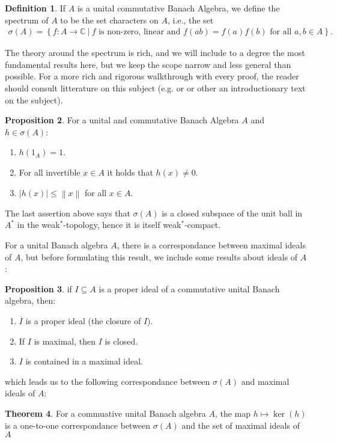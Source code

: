 \documentclass[10pt,twoside,openany,final]{memoir}
\theoremstyle{definition}
\newtheorem{theorem}{Theorem}[chapter]
\newtheorem{proposition}[theorem]{Proposition}
\newtheorem{definition}[theorem]{Definition}
\theoremstyle{Break}
\newcommand{\lv}{\left\lVert}
\newcommand{\rv}{\right\rVert}
\newcommand{\C}{\mathbb{C}}
\begin{document}
\begin{definition}
	If $A$ is a unital commutative Banach Algebra, we define the spectrum of $A$ to be the set characters on $A$, i.e., the set
	\begin{align*}
		\sigma(A)=\left\{ f \colon A \to \C \ \big| \ f \text{ is non-zero, linear and } f(ab)=f(a)f(b) \text{ for all } a,b \in A \right\}.
	\end{align*}
\end{definition}
The theory around the spectrum is rich, and we will include to a degree the most fundamental results here, but we keep the scope narrow and less general than possible. For a more rich and rigorous walkthrough with every proof, the reader should consult litterature on this subject (e.g. \cite{blackadar2006operator} or \cite{zhu1993introduction} or other an introductionary text on the subject).

\begin{proposition}
	For a unital and commutative Banach Algebra $A$ and $h \in \sigma(A)$:
	\begin{enumerate}
		\item $h(1_A)=1$.
		\item For all invertible $x \in A$ it holds that $h(x) \neq 0$.
		\item $|h(x)| \leq \lv x \rv$ for all $x \in A$.
	\end{enumerate}
\end{proposition}
The last assertion above says that $\sigma(A)$ is a closed subspace of the unit ball in $A^*$ in the weak$^*$-topology, hence it is itself weak$^*$-compact.

For a unital Banach algebra $A$, there is a correspondance between maximal ideals of $A$, but before formulating this result, we include some results about ideals of $A$:
\begin{proposition}
	if $I \subseteq A$ is a proper ideal of a commutative unital Banach algebra, then:
	\begin{enumerate}
		\item $\overline{I}$ is a proper ideal (the closure of $I$).
		\item If $I$ is maximal, then $I$ is closed.
		\item $I$ is contained in a maximal ideal.
	\end{enumerate}
\end{proposition}
which leads us to the following correspondance between $\sigma(A)$ and maximal ideals of $A$:
\begin{theorem}
	For a commuative unital Banach algebra $A$, the map $h \mapsto \ker(h)$ is a one-to-one correspondance between $\sigma(A)$ and the set of maximal ideals of $A$
	\label{1.12}
\end{theorem}
\end{document}
